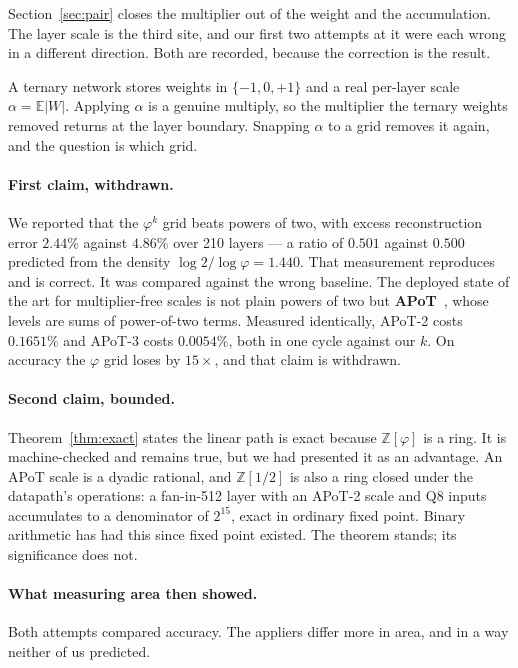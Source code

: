 \documentclass[11pt]{article}
\theoremstyle{definition}
\begin{document}
Section~\ref{sec:pair} closes the multiplier out of the weight and the
accumulation. The layer scale is the third site, and our first two attempts at it
were each wrong in a different direction. Both are recorded, because the
correction is the result.

A ternary network stores weights in $\{-1,0,+1\}$ and a real per-layer scale
$\alpha = \mathbb{E}|W|$. Applying $\alpha$ is a genuine multiply, so the
multiplier the ternary weights removed returns at the layer boundary. Snapping
$\alpha$ to a grid removes it again, and the question is which grid.

\paragraph{First claim, withdrawn.} We reported that the $\varphi^{k}$ grid beats
powers of two, with excess reconstruction error $2.44\%$ against $4.86\%$ over 210
layers --- a ratio of $0.501$ against $0.500$ predicted from the density
$\log 2 / \log\varphi = 1.440$. That measurement reproduces and is correct. It was
compared against the wrong baseline. The deployed state of the art for
multiplier-free scales is not plain powers of two but \textbf{APoT}~\cite{li2020apot}, whose levels
are sums of power-of-two terms. Measured identically, APoT-2 costs $0.1651\%$ and
APoT-3 costs $0.0054\%$, both in one cycle against our $k$. On accuracy the
$\varphi$ grid loses by $15\times$, and that claim is withdrawn.

\paragraph{Second claim, bounded.} Theorem~\ref{thm:exact} states the linear path
is exact because $\mathbb{Z}[\varphi]$ is a ring. It is machine-checked and
remains true, but we had presented it as an advantage. An APoT scale is a dyadic
rational, and $\mathbb{Z}[1/2]$ is also a ring closed under the datapath's
operations: a fan-in-512 layer with an APoT-2 scale and Q8 inputs accumulates to a
denominator of $2^{15}$, exact in ordinary fixed point. Binary arithmetic has had
this since fixed point existed. The theorem stands; its significance does not.

\paragraph{What measuring area then showed.} Both attempts compared accuracy. The
appliers differ more in area, and in a way neither of us predicted.
\end{document}
